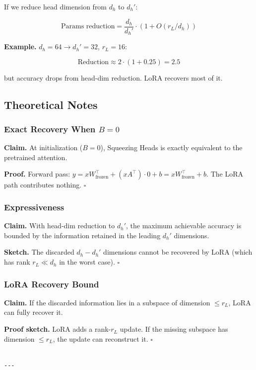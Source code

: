 If we reduce head dimension from $d_h$ to $d_h'$:

\[
\text{Params reduction} = \frac{d_h}{d_h'} \cdot \left(1 + O(r_L / d_h)\right)
\]

\textbf{Example.} $d_h = 64 \to d_h' = 32$, $r_L = 16$:

\[
\text{Reduction} \approx 2 \cdot (1 + 0.25) = 2.5
\]

but accuracy drops from head-dim reduction. LoRA recovers most of it.

\subsection{Theoretical Notes}

\subsubsection{Exact Recovery When $B = 0$}

\textbf{Claim.} At initialization ($B = 0$), Squeezing Heads is exactly 
equivalent to the pretrained attention.

\textbf{Proof.} Forward pass: $y = x W_\text{frozen}^\top + (x A^\top) \cdot 0 + b = x W_\text{frozen}^\top + b$. The LoRA path contributes nothing. $\square$

\subsubsection{Expressiveness}

\textbf{Claim.} With head-dim reduction to $d_h'$, the maximum achievable 
accuracy is bounded by the information retained in the leading $d_h'$ 
dimensions.

\textbf{Sketch.} The discarded $d_h - d_h'$ dimensions cannot be recovered by 
LoRA (which has rank $r_L \ll d_h$ in the worst case). $\square$

\subsubsection{LoRA Recovery Bound}

\textbf{Claim.} If the discarded information lies in a subspace of dimension 
$\leq r_L$, LoRA can fully recover it.

\textbf{Proof sketch.} LoRA adds a rank-$r_L$ update. If the missing subspace 
has dimension $\leq r_L$, the update can reconstruct it. $\square$
\begin{lstlisting}

---
\end{lstlisting}


